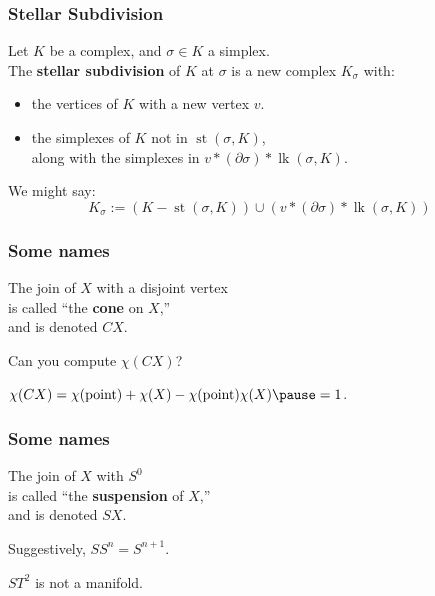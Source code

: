 \documentclass[14pt]{beamer}
\newcommand{\boundary}{\partial}
\newcommand{\join}{\ast}
\DeclareMathOperator{\st}{st}
\DeclareMathOperator{\lk}{lk}
\newcommand{\setbackgroundpicture}[1]{%
\usebackgroundtemplate{
\begin{pgfpicture}{0in}{0in}{\paperwidth}{\paperheight}
\pgfputat{\pgfxy(0,0)}{\texttt{[image: \#1]}}
\color{white}
\pgfsetfillopacity{0.8}
\pgfrect[fill]{\pgfxy(0,0)}{\pgfpoint{\paperwidth}{\paperheight}}
\end{pgfpicture}
}
}
\newcommand{\clearbackgroundpicture}{\usebackgroundtemplate{}}
\begin{document}
\setbackgroundpicture{Crab_Nebula.jpg}
\begin{frame}
\frametitle{Stellar Subdivision} 

\begin{definition}
  Let $K$ be a complex, and $\sigma \in K$ a simplex.  \\
  The \textbf{stellar subdivision} of $K$ at $\sigma$ is a new complex
  $K_\sigma$ with:
\begin{itemize}
\item the vertices of $K$ with a new vertex $v$.
\item the simplexes of $K$ not in $\st(\sigma,K)$,\\
  along with the simplexes in $v \join (\boundary \sigma) \join \lk(\sigma,K)$.
\end{itemize}
We might say:
$$
K_\sigma := (K - \st(\sigma,K)) \cup (v \join (\boundary \sigma) \join
\lk(\sigma,K))
$$
\end{definition}

\end{frame}
\clearbackgroundpicture

\begin{frame}
  \frametitle{Some names}

  The join of $X$ with a disjoint vertex \\
  is called ``the \textbf{cone} on $X$,'' \\
  and is denoted $CX$.

  \pause
  \vfill

  Can you compute $\chi(CX)$?

  \pause
  \vfill

  $\chi(CX) = \chi(\mbox{point}) + \chi(X) -
  \chi(\mbox{point})\chi(X) \pause = 1$.
  

\end{frame}

\begin{frame}
  \frametitle{Some names}

  The join of $X$ with $S^0$ \\
  is called ``the \textbf{suspension} of $X$,'' \\
  and is denoted $SX$.

  \pause
  \vfill

  Suggestively, $SS^n = S^{n+1}$.

  \pause
  \vfill

  $ST^2$ is not a manifold.

\end{frame}
\end{document}
